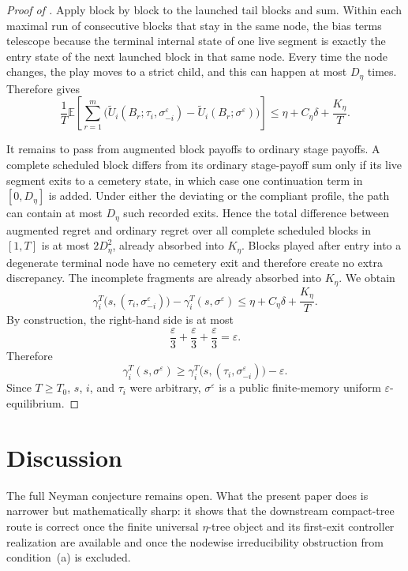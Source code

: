 \documentclass[12pt]{article}
\theoremstyle{definition}
\newcommand{\eps}{\varepsilon}
\newcommand{\E}{\mathbb{E}}
\newcommand{\1}{\mathbf{1}}
\begin{document}
\begin{proof}[Proof of ]
Apply  block by block to the launched tail blocks and sum.
Within each maximal run of consecutive blocks that stay in the same node, the
bias terms telescope because the terminal internal state of one live segment is
exactly the entry state of the next launched block in that same node. Every time
the node changes, the play moves to a strict child, and this can happen at most
$D_\eta$ times. Therefore  gives
\[
\frac1T\E\left[\sum_{r=1}^m
\bigl(
\widetilde U_i(B_r;\tau_i,\sigma^\eps_{-i})
-
\widetilde U_i(B_r;\sigma^\eps)
\bigr)\right]
\le
\eta + C_\eta\delta + \frac{K_\eta}{T}.
\]

It remains to pass from augmented block payoffs to ordinary stage payoffs. A
complete scheduled block differs from its ordinary stage-payoff sum only if its
live segment exits to a cemetery state, in which case one continuation term in
$[0,D_\eta]$ is added. Under either the deviating or the compliant profile, the
path can contain at most $D_\eta$ such recorded exits. Hence the total difference
between augmented regret and ordinary regret over all complete scheduled blocks
in $[1,T]$ is at most $2D_\eta^2$, already absorbed into $K_\eta$. Blocks played
after entry into a degenerate terminal node have no cemetery exit and therefore
create no extra discrepancy. The incomplete fragments are already absorbed into
$K_\eta$. We obtain
\[
\gamma_i^T\bigl(s,(\tau_i,\sigma^\eps_{-i})\bigr)
-
\gamma_i^T(s,\sigma^\eps)
\le
\eta + C_\eta\delta + \frac{K_\eta}{T}.
\]
By construction, the right-hand side is at most
\[
\frac{\eps}{3}+\frac{\eps}{3}+\frac{\eps}{3}=\eps.
\]
Therefore
\[
\gamma_i^T(s,\sigma^\eps)
\ge
\gamma_i^T\bigl(s,(\tau_i,\sigma^\eps_{-i})\bigr)-\eps.
\]
Since $T\ge T_0$, $s$, $i$, and $\tau_i$ were arbitrary, $\sigma^\eps$ is a
public finite-memory uniform $\eps$-equilibrium.
\end{proof}

\section{Discussion}

The full Neyman conjecture remains open. What the present paper does is narrower
but mathematically sharp: it shows that the downstream compact-tree route is
correct once the finite universal $\eta$-tree object and its first-exit controller
realization are available and once the nodewise irreducibility obstruction from
condition~\textnormal{(a)} is excluded.
\end{document}
